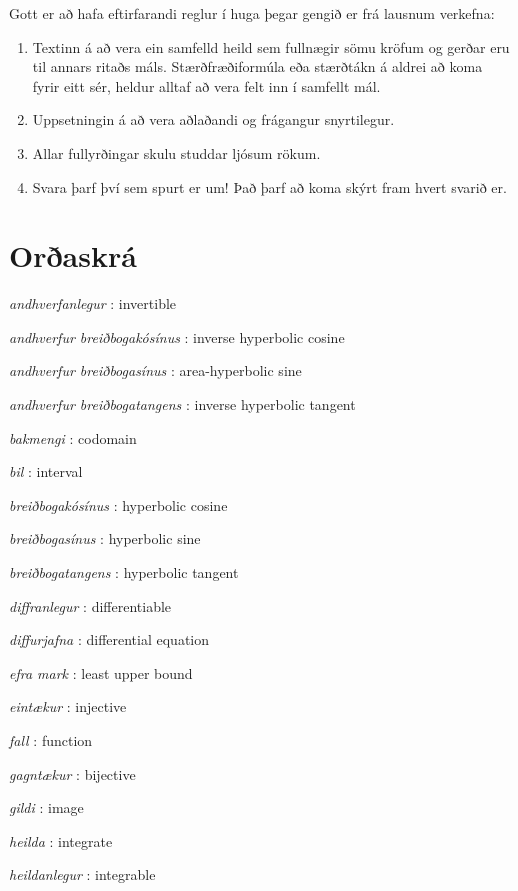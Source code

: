 \documentclass[b5paper,10pt,icelandic]{sphinxmanual}
\begin{document}
Gott er að hafa eftirfarandi reglur í huga þegar gengið er frá lausnum
verkefna:
\begin{enumerate}
\item {} 
Textinn á að vera ein samfelld heild sem fullnægir sömu kröfum og
gerðar eru til annars ritaðs máls. Stærðfræðiformúla eða stærðtákn á
aldrei að koma fyrir eitt sér, heldur alltaf að vera felt inn í samfellt
mál.

\item {} 
Uppsetningin á að vera aðlaðandi og frágangur snyrtilegur.

\item {} 
Allar fullyrðingar skulu studdar ljósum rökum.

\item {} 
Svara þarf því sem spurt er um! Það þarf að koma skýrt fram hvert
svarið er.

\end{enumerate}

\chapter{Orðaskrá}
\label{ordaskra:oraskra}\label{ordaskra::doc}
\emph{andhverfanlegur} : invertible

\emph{andhverfur breiðbogakósínus} : inverse hyperbolic cosine


\emph{andhverfur breiðbogasínus} : area-hyperbolic sine

\emph{andhverfur breiðbogatangens} : inverse hyperbolic tangent


\emph{bakmengi} : codomain

\emph{bil} : interval


\emph{breiðbogakósínus} : hyperbolic cosine


\emph{breiðbogasínus} : hyperbolic sine


\emph{breiðbogatangens} : hyperbolic tangent


\emph{diffranlegur} : differentiable


\emph{diffurjafna} : differential equation


\emph{efra mark} : least upper bound

\emph{eintækur} : injective

\emph{fall} : function


\emph{gagntækur} : bijective

\emph{gildi} : image

\emph{heilda} : integrate


\emph{heildanlegur} : integrable
\end{document}
